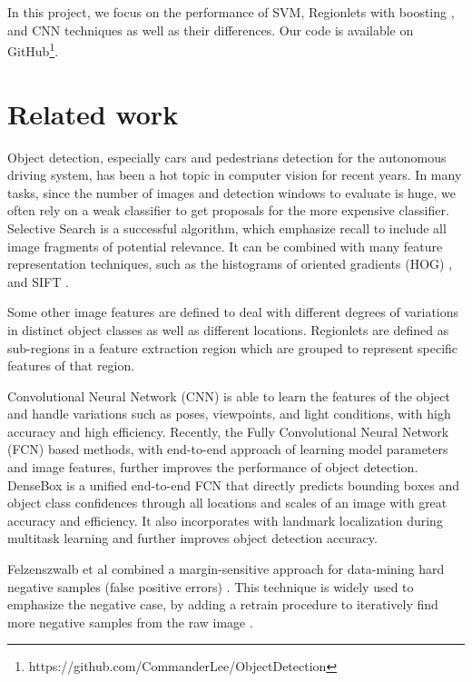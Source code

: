 \documentclass{article} %
\begin{document}
In this project, we focus on the performance of SVM, Regionlets with boosting \cite{Wang2013}, and CNN techniques as well as their differences. Our code is available on GitHub\footnote{https://github.com/CommanderLee/ObjectDetection}.

\section{Related work}

Object detection, especially cars and pedestrians detection for the autonomous driving system, has been a hot topic in computer vision for recent years. In many tasks, since the number of images and detection windows to evaluate is huge, we often rely on a weak classifier to get proposals for the more expensive classifier. Selective Search \cite{van2011segmentation} is a successful algorithm, which emphasize recall to include all image fragments of potential relevance. It can be combined with many feature representation techniques, such as the histograms of oriented gradients (HOG) \cite{dalal2005histograms}, and SIFT \cite{lowe2004distinctive}. 

Some other image features are defined to deal with different degrees of variations in distinct object classes as well as different locations. Regionlets \cite{Wang2013} are defined as sub-regions in a feature extraction region which are grouped to represent specific features of that region.

Convolutional Neural Network (CNN) \cite{Krizhevsky2012} is able to learn the features of the object and handle variations such as poses, viewpoints, and light conditions, with high accuracy and high efficiency. Recently, the Fully Convolutional Neural Network (FCN) based methods, with end-to-end approach of learning model parameters and image features, further improves the performance of object detection. DenseBox \cite{Huang2015} is a unified end-to-end FCN that directly predicts bounding boxes and object class confidences through all locations and scales of an image with great accuracy and efficiency. It also incorporates with landmark localization during multitask learning and further improves object detection accuracy. 

Felzenszwalb et al \cite{felzenszwalb2010object} combined a margin-sensitive approach for data-mining hard negative samples (false positive errors) \cite{van2011segmentation}. This technique is widely used to emphasize the negative case, by adding a retrain procedure to iteratively find more negative samples from the raw image \cite{van2011segmentation}.
\end{document}
